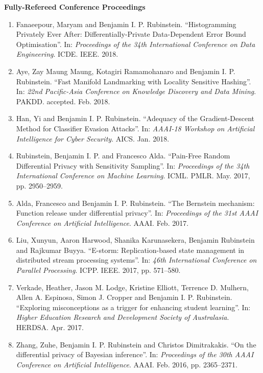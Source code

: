 \documentclass[a4paper,12pt]{article}
\begin{document}
\noindent\textbf{Fully-Refereed Conference Proceedings}

\begin{enumerate}
\setcounter{enumi}{\value{list}}

\item Fanaeepour, Maryam and Benjamin I. P. Rubinstein.
``Histogramming Privately Ever After: Differentially-Private Data-Dependent Error Bound Optimisation''.
In: 
\emph{Proceedings of the 34th International Conference on Data Engineering}.
ICDE.
IEEE.
2018.

\item Aye, Zay Maung Maung, Kotagiri Ramamohanaro and Benjamin I. P. Rubinstein.
``Fast Manifold Landmarking with Locality Sensitive Hashing''.
In: 
\emph{22nd Pacific-Asia Conference on Knowledge Discovery and Data Mining}.
PAKDD.
accepted.
Feb. 2018.

\item Han, Yi and Benjamin I. P. Rubinstein.
``Adequacy of the Gradient-Descent Method for Classifier Evasion Attacks''.
In: 
\emph{AAAI-18 Workshop on Artificial Intelligence for Cyber Security}.
AICS.
Jan. 2018.

\item Rubinstein, Benjamin I. P. and Francesco Alda.
``Pain-Free Random Differential Privacy with Sensitivity Sampling''.
In: 
\emph{Proceedings of the 34th International Conference on Machine Learning}.
ICML.
PMLR.
May. 2017, pp. 2950--2959.

\item Alda, Francesco and Benjamin I. P. Rubinstein.
``The Bernstein mechanism: Function release under differential privacy''.
In: 
\emph{Proceedings of the 31st AAAI Conference on Artificial Intelligence}.
AAAI.
Feb. 2017.

\item Liu, Xunyun, Aaron Harwood, Shanika Karunasekera, Benjamin Rubinstein and Rajkumar Buyya.
``E-storm: Replication-based state management in distributed stream processing systems''.
In: 
\emph{46th International Conference on Parallel Processing}.
ICPP.
IEEE.
2017, pp. 571--580.

\item Verkade, Heather, Jason M. Lodge, Kristine Elliott, Terrence D. Mulhern, Allen A. Espinosa, Simon J. Cropper and Benjamin I. P. Rubinstein.
``Exploring misconceptions as a trigger for enhancing student learning''.
In: 
\emph{Higher Education Research and Development Society of Australasia}.
HERDSA.
Apr. 2017.

\item Zhang, Zuhe, Benjamin I. P. Rubinstein and Christos Dimitrakakis.
``On the differential privacy of Bayesian inference''.
In: 
\emph{Proceedings of the 30th AAAI Conference on Artificial Intelligence}.
AAAI.
Feb. 2016, pp. 2365--2371.


\end{enumerate}
\end{document}
